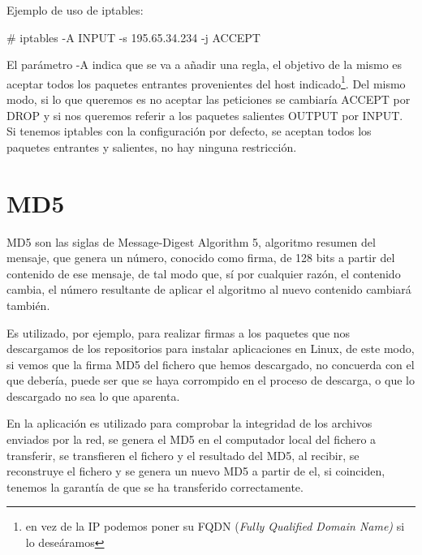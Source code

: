 Ejemplo de uso de iptables:

\begin{center}
\# iptables -A INPUT -s 195.65.34.234 -j ACCEPT\\
\end{center}


El par\'ametro -A indica que se va a a\~nadir una regla, el objetivo de la mismo es aceptar todos los paquetes entrantes provenientes del host indicado\footnote{en vez de la IP podemos poner su FQDN (\emph{Fully Qualified Domain Name)} si lo deseáramos}. Del mismo modo, si lo que queremos es no aceptar las peticiones se cambiar\'ia ACCEPT por DROP y si nos queremos referir a los paquetes salientes OUTPUT por INPUT.
Si tenemos iptables con la configuración por defecto, se aceptan todos los paquetes entrantes y salientes, no hay ninguna restricción.


\section{MD5}

MD5 son las siglas de Message-Digest Algorithm 5, algoritmo resumen del mensaje, que genera un número, conocido como firma, de 128 bits a partir del contenido de ese mensaje, de tal modo que, sí por cualquier razón, el contenido cambia, el número resultante de aplicar el algoritmo al nuevo contenido cambiará también.
\newline

Es utilizado, por ejemplo, para realizar firmas a los paquetes que nos descargamos de los repositorios para instalar aplicaciones en Linux, de este modo, si vemos que la firma MD5 del fichero que hemos descargado, no concuerda con el que debería, puede ser que se haya corrompido en el proceso de descarga, o que lo descargado no sea lo que aparenta.
\newline

En la aplicación es utilizado para comprobar la integridad de los archivos enviados por la red, se genera el MD5 en el computador local del fichero a transferir, se transfieren el fichero y el resultado del MD5, al recibir, se reconstruye el fichero y se genera un nuevo MD5 a partir de el, si coinciden, tenemos la garantía de que se ha transferido correctamente.
